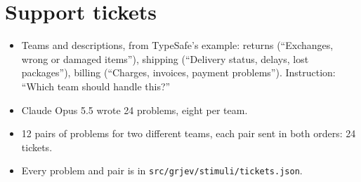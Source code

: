 \section{Support tickets}
\label{app:tickets}
\begin{itemize}
\item Teams and descriptions, from TypeSafe's example: returns (``Exchanges, wrong or damaged items''), shipping (``Delivery status, delays, lost packages''), billing (``Charges, invoices, payment problems''). Instruction: ``Which team should handle this?''
\item Claude Opus 5.5 wrote 24 problems, eight per team.
\item 12 pairs of problems for two different teams, each pair sent in both orders: 24 tickets.
\item Every problem and pair is in \texttt{src/grjev/stimuli/tickets.json}.
\end{itemize}

